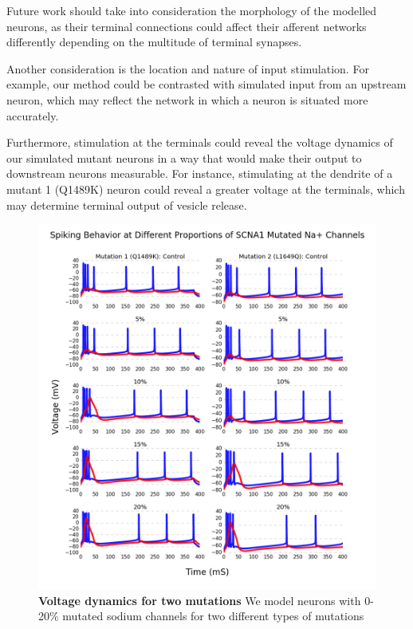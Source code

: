 
Future work should take into consideration the morphology of the modelled neurons, as their terminal
connections could affect their afferent networks differently depending on the multitude of terminal
synapses.


Another consideration is the location and nature of input stimulation. For example, our method could
be contrasted with simulated input from an upstream neuron, which may reflect the network in which a
neuron is situated more accurately.

Furthermore, stimulation at the terminals could reveal the
voltage dynamics of our simulated mutant neurons in a way that would make their output to downstream
neurons measurable. For instance, stimulating at the dendrite of a mutant 1 (Q1489K) neuron could
reveal a greater voltage at the terminals, which may determine terminal output of vesicle release.


\begin{figure}[!!h]
    \centering
    \includegraphics[width=1\textwidth]{images/spikes_all.png}
    \caption{\textbf{Voltage dynamics for two mutations} We model neurons with 0-20\% mutated sodium
    channels for two different types of mutations}
    \label{fig:volt}
\end{figure}


